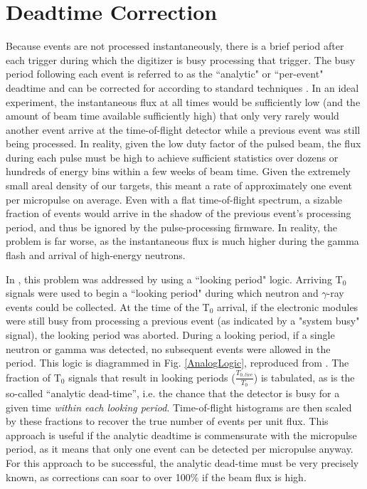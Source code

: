 \section{Deadtime Correction} \label{DeadtimeCorrection}
Because events are not processed instantaneously, there is a brief period
after each trigger during which the digitizer is busy processing that trigger.
 The busy period following each event is referred to as the ``analytic" or ``per-event" deadtime and can be corrected for according to standard techniques \cite{Moore1980}.
In an ideal experiment, the instantaneous flux at all times would be
sufficiently low (and the amount of beam time available sufficiently high) that
only very rarely would another event arrive at the time-of-flight detector while
a previous event was still being processed. In reality, given the low duty
factor of the pulsed beam, the flux during each pulse must be high to achieve sufficient
statistics over dozens or hundreds of energy bins within a few weeks of beam
time. Given the extremely small areal density of our targets, this meant a rate
of approximately one event per micropulse on average. Even with a flat
time-of-flight spectrum, a sizable fraction of events would arrive in the shadow
of the previous event's processing period, and thus be ignored by the pulse-processing firmware.
In reality, the
problem is far worse, as the instantaneous flux is much higher during the gamma
flash and arrival of high-energy neutrons.

In \cite{Finlay1993, Abfalterer2001}, this problem was addressed by using a
``looking period" logic. Arriving T$_{0}$ signals were used to begin a ``looking 
period" during which neutron and $\gamma$-ray
events could be collected. At the time of the T$_{0}$ arrival, if the electronic modules
were still busy from processing a previous event (as indicated by a "system busy" signal),
the looking period was aborted. During a looking period, if a single neutron or gamma
was detected, no subsequent events were allowed in the period.
This logic is diagrammed in Fig. \ref{AnalogLogic}, reproduced from
\cite{Abfalterer2001}. The fraction of T$_{0}$ signals that result in looking
periods ($\frac{T_{0,live}}{T_{0}}$) is tabulated, as is the so-called ``analytic dead-time'', i.e. 
the chance that the detector is busy for a given time \textit{within each looking period}.
Time-of-flight histograms are then scaled by these
fractions to recover the true number of events per unit flux. This approach is useful if the
analytic deadtime is commensurate with the micropulse period, as it means that
only one event can be detected per micropulse anyway. For this approach to be successful, the
analytic dead-time must be very precisely known, as corrections can soar to over 100\%
if the beam flux is high.

